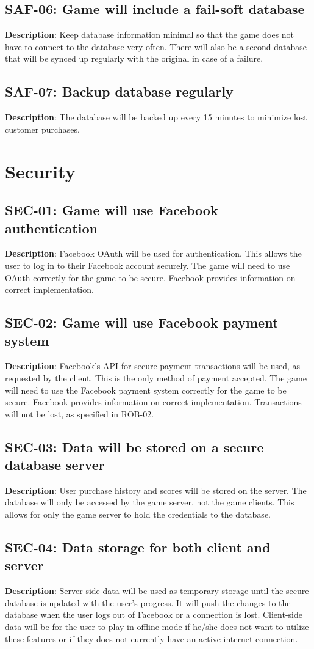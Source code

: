 \subsection{SAF-06: Game will include a fail-soft database}
\textbf{Description}: Keep database information minimal so that the game does
not have to connect to the database very often. There will also be
a second database that will be synced up regularly with the original
in case of a failure.
\subsection{SAF-07: Backup database regularly}
\textbf{Description}: The database will be backed up every 15 minutes to minimize
lost customer purchases.
\section{Security}
\subsection{SEC-01: Game will use Facebook authentication}
\textbf{Description}: Facebook OAuth will be used for authentication. This
allows the user to log in to their Facebook account securely. The
game will need to use OAuth correctly for the game to be secure. Facebook
provides information on correct implementation.
\subsection{SEC-02: Game will use Facebook payment system}
\textbf{Description}: Facebook\textquoteright{}s API for secure payment transactions
will be used, as requested by the client. This is the only method
of payment accepted. The game will need to use the Facebook payment
system correctly for the game to be secure. Facebook provides information
on correct implementation. Transactions will not be lost, as specified
in ROB-02.
\subsection{SEC-03: Data will be stored on a secure database server}
\textbf{Description}: User purchase history and scores will be stored on the
server. The database will only be accessed by the game server, not
the game clients. This allows for only the game server to hold the
credentials to the database. 
\subsection{SEC-04: Data storage for both client and server}
\textbf{Description}: Server-side data will be used as temporary storage until
the secure database is updated with the user\textquoteright{}s progress.
It will push the changes to the database when the user logs out of
Facebook or a connection is lost. Client-side data will be for the
user to play in offline mode if he/she does not want to utilize these
features or if they does not currently have an active internet connection.
